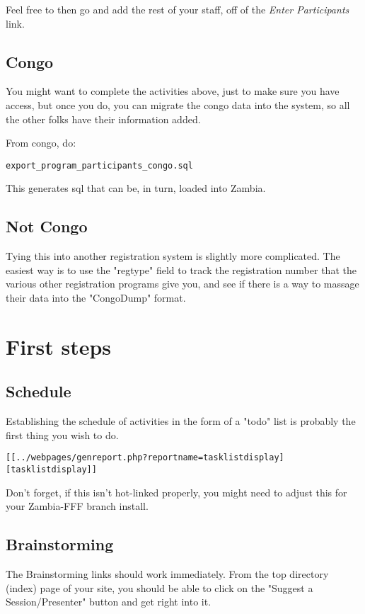 \documentclass[captions=tablesignature]{scrartcl}
\begin{document}
Feel free to then go and add the rest of your staff, off of the
\emph{Enter Participants} link.

\subsection{Congo}
\label{sec-7-2}
You might want to complete the activities above, just to make sure
you have access, but once you do, you can migrate the congo data
into the system, so all the other folks have their information
added.

From congo, do:
\begin{verbatim}
export_program_participants_congo.sql
\end{verbatim}

This generates sql that can be, in turn, loaded into Zambia.
\subsection{Not Congo}
\label{sec-7-3}
Tying this into another registration system is slightly more
complicated.  The easiest way is to use the "regtype" field to
track the registration number that the various other registration
programs give you, and see if there is a way to massage their data
into the "CongoDump" format.

\section{First steps}
\label{sec-8}
\subsection{Schedule}
\label{sec-8-1}
Establishing the schedule of activities in the form of a "todo"
list is probably the first thing you wish to do.

\begin{verbatim}
[[../webpages/genreport.php?reportname=tasklistdisplay][tasklistdisplay]]
\end{verbatim}

Don't forget, if this isn't hot-linked properly, you might need to
adjust this for your Zambia-FFF branch install.

\subsection{Brainstorming}
\label{sec-8-2}
The Brainstorming links should work immediately.  From the top
directory (index) page of your site, you should be able to click on
the "Suggest a Session/Presenter" button and get right into it.
\end{document}
